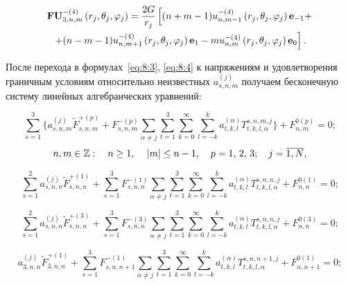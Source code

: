 \begin{multline}
{\bf{FU}}_{3,n,m}^{ - (4)}\left( {{r_j},{\theta _j},{\varphi _j}} \right) = \frac{{2G}}{{{r_j}}}\left[ {(n + m - 1)u_{n,m - 1}^{ - (4)}\left( {{r_j},{\theta _j},{\varphi _j}} \right){{\bf{e}}_{ - 1}} + } \right.\\
\left. { + (n - m - 1)u_{n,m + 1}^{ - (4)}\left( {{r_j},{\theta _j},{\varphi _j}} \right){{\bf{e}}_1} - mu_{n,m}^{ - (4)}\left( {{r_j},{\theta _j},{\varphi _j}} \right){{\bf{e}}_0}} \right].
\label{eq:8:f6}
\end{multline}

После перехода в формулах~\eqref{eq:8:3}, \eqref{eq:8:4} к напряжениям и удовлетворения граничным условиям относительно неизвестных $a_{s,n,m}^{(j)}$ получаем бесконечную систему линейных алгебраических уравнений:

\begin{equation}
\sum _{s=1}^3 \bigg\{a_{s,n,m}^{(j)}{\tilde F}_{s,n,m}^{+(p)}+F_{s,n,m}^{-(p)}\sum _{\alpha\neq j} \sum _{t=1}^3 \sum _{k=0}^{\infty}\sum_{l=-k}^k a_{t,k,l}^{(\alpha)} T_{t,k,l,\alpha}^{s,n,m,j}\bigg\}+F_{n,m}^{0(p)}=0;
\label{eq:13:1}
\end{equation}
$$
n,m \in\mathbb{Z}:\quad n \ge 1,{\mkern 1mu} \quad {\kern 1pt} |m| \le n - 1,\quad {\mkern 1mu} p =  1,{\mkern 1mu} {\kern 1pt} 2,{\mkern 1mu} {\kern 1pt} 3;\;\;\;{\mkern 1mu} {\kern 1pt} j = \overline {1,N},
$$

\begin{equation}
\sum _{s=1}^2 a_{s,n,n}^{(j)}{\tilde F}_{s,n,n}^{+(1)}+\sum_{s=1}^3 F_{s,n,n}^{-(1)}\sum _{\alpha\neq j} \sum _{t=1}^3 \sum _{k=0}^{\infty}\sum_{l=-k}^k a_{t,k,l}^{(\alpha)} T_{t,k,l,\alpha}^{s,n,n,j}+F_{n,n}^{0(1)}=0;
\label{eq:13:2}
\end{equation}

\begin{equation}
\sum _{s=1}^2 a_{s,n,n}^{(j)}{\tilde F}_{s,n,n}^{+(3)}+\sum_{s=1}^3 F_{s,n,n}^{-(3)}\sum _{\alpha\neq j} \sum _{t=1}^3 \sum _{k=0}^{\infty}\sum_{l=-k}^k a_{t,k,l}^{(\alpha)} T_{t,k,l,\alpha}^{s,n,n,j}+F_{n,n}^{0(3)}=0;
\label{eq:13:3}
\end{equation}

\begin{equation}
a_{3,n,n}^{(j)}{\tilde F}_{3,n,n}^{+(1)}+\sum_{s=1}^3 F_{s,n,n+1}^{-(1)}\sum _{\alpha\neq j} \sum _{t=1}^3 \sum _{k=0}^{\infty}\sum_{l=-k}^k a_{t,k,l}^{(\alpha)} T_{t,k,l,\alpha}^{s,n,n+1,j}+F_{n,n+1}^{0(1)}=0;
\label{eq:13:4}
\end{equation}

